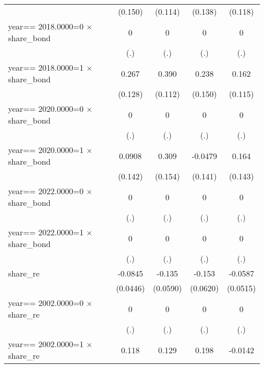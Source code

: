 \begin{table}[htbp]
\begin{tabular}{l*{4}{c}}
                &  (0.150)         &  (0.114)         &  (0.138)         &  (0.118)         \\
\addlinespace
year==  2018.0000=0 $\times$ share\_bond&        0         &        0         &        0         &        0         \\
                &      (.)         &      (.)         &      (.)         &      (.)         \\
\addlinespace
year==  2018.0000=1 $\times$ share\_bond&    0.267\sym{**} &    0.390\sym{***}&    0.238         &    0.162         \\
                &  (0.128)         &  (0.112)         &  (0.150)         &  (0.115)         \\
\addlinespace
year==  2020.0000=0 $\times$ share\_bond&        0         &        0         &        0         &        0         \\
                &      (.)         &      (.)         &      (.)         &      (.)         \\
\addlinespace
year==  2020.0000=1 $\times$ share\_bond&   0.0908         &    0.309\sym{**} &  -0.0479         &    0.164         \\
                &  (0.142)         &  (0.154)         &  (0.141)         &  (0.143)         \\
\addlinespace
year==  2022.0000=0 $\times$ share\_bond&        0         &        0         &        0         &        0         \\
                &      (.)         &      (.)         &      (.)         &      (.)         \\
\addlinespace
year==  2022.0000=1 $\times$ share\_bond&        0         &        0         &        0         &        0         \\
                &      (.)         &      (.)         &      (.)         &      (.)         \\
\addlinespace
share\_re        &  -0.0845\sym{*}  &   -0.135\sym{**} &   -0.153\sym{**} &  -0.0587         \\
                & (0.0446)         & (0.0590)         & (0.0620)         & (0.0515)         \\
\addlinespace
year==  2002.0000=0 $\times$ share\_re&        0         &        0         &        0         &        0         \\
                &      (.)         &      (.)         &      (.)         &      (.)         \\
\addlinespace
year==  2002.0000=1 $\times$ share\_re&    0.118         &    0.129\sym{*}  &    0.198\sym{*}  &  -0.0142         \\

\end{tabular}
\end{table}
